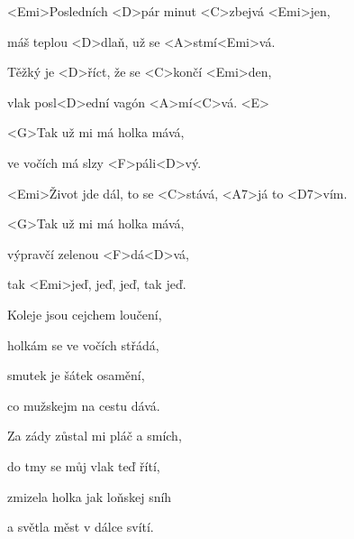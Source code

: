 

\zs
<Emi>Posledních <D>pár minut <C>zbejvá <Emi>jen,

máš teplou <D>dlaň, už se <A>stmí<Emi>vá.

Těžký je <D>říct, že se <C>končí <Emi>den,

vlak posl<D>ední vagón <A>mí<C>vá. <E>
\ks

\zr
<G>Tak už mi má holka mává,

ve vočích má slzy <F>páli<D>vý.

<Emi>Život jde dál, to se <C>stává, <A7>já to <D7>vím.

<G>Tak už mi má holka mává,

výpravčí zelenou <F>dá<D>vá,

tak <Emi>jeď, jeď, jeď, tak jeď.
\kr

\zs
Koleje jsou cejchem loučení,

holkám se ve vočích střádá,

smutek je šátek osamění,

co mužskejm na cestu dává.
\ks

\zr \kr

\zs
Za zády zůstal mi pláč a smích,

do tmy se můj vlak teď řítí,

zmizela holka jak loňskej sníh

a světla měst v dálce svítí.
\ks

\zr \kr

\kp
